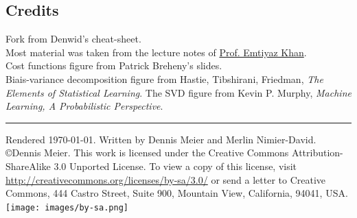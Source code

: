 \documentclass[10pt,a4paper,landscape]{article}
\begin{document}
\begin{multicols*}{4}



\section{Credits}
Fork from Denwid's cheat-sheet.\\
Most material was taken from the lecture notes of \href{http://people.epfl.ch/228491}{Prof. Emtiyaz Khan}.\\
Cost functions figure from Patrick Breheny's slides.\\
Biais-variance decomposition figure from Hastie, Tibshirani, Friedman, \textit{The Elements of Statistical Learning}.
The SVD figure from Kevin P. Murphy, \textit{Machine Learning, A Probabilistic Perspective}.

\hrule
\tiny
Rendered \today. Written by Dennis Meier and Merlin Nimier-David.
\copyright Dennis Meier. This work is licensed under the Creative Commons Attribution-ShareAlike 3.0 Unported License.
To view a copy of this license, visit \href{http://creativecommons.org/licenses/by-sa/3.0/}{http://creativecommons.org/licenses/by-sa/3.0/} or
send a letter to Creative Commons, 444 Castro Street, Suite 900, Mountain View, California, 94041, USA.
\texttt{[image: images/by-sa.png]}

\end{multicols*}
\end{document}
